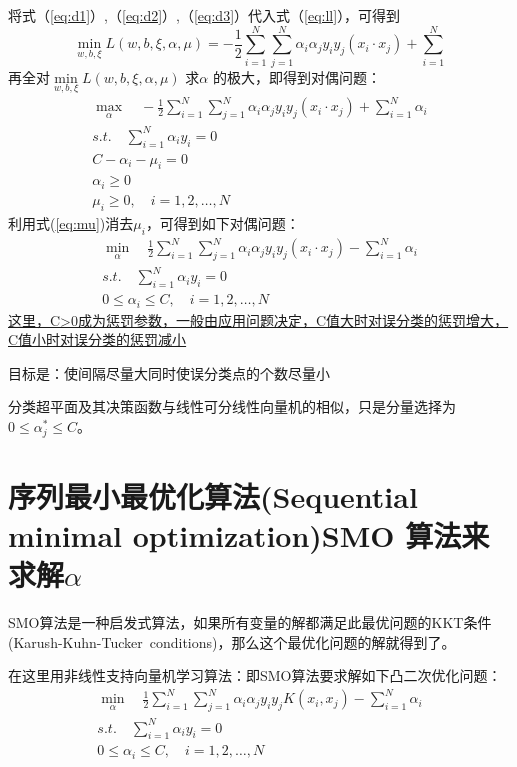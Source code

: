 \documentclass{article}
\begin{document}
将式（\ref{eq:d1}）,（\ref{eq:d2}）,（\ref{eq:d3}）代入式（\ref{eq:ll}），可得到
\begin{equation}
    \min\limits_{w,b,\xi} L(w,b,\xi,\alpha,\mu)=-\frac{1}{2}\sum_{i=1}^{N}\sum_{j=1}^{N}\alpha_i \alpha_j y_i y_j(x_i\cdot x_j)+\sum_{i=1}^{N}
\end{equation}
再全对$\min\limits_{w,b,\xi} L(w,b,\xi,\alpha,\mu)$ 求$\alpha$ 的极大，即得到对偶问题：
\begin{gather}
    \max\limits_{\alpha}\quad -\frac{1}{2}\sum_{i=1}^{N}\sum_{j=1}^{N}\alpha_i \alpha_j y_i y_j(x_i\cdot x_j)+\sum_{i=1}^{N}\alpha_i\\
    s.t.\quad \sum_{i=1}^{N}\alpha_i y_i=0\\
    C-\alpha_i-\mu_i=0   \label{eq:mu}\\
    \alpha_i\ge0\\
    \mu_i\ge0,\quad i=1,2,\dots,N
\end{gather}
利用式(\ref{eq:mu})消去$\mu_i$，可得到如下对偶问题：
\begin{gather}    
    \min\limits_{\alpha}\quad \frac{1}{2}\sum_{i=1}^{N}\sum_{j=1}^{N}\alpha_i \alpha_j y_i y_j(x_i\cdot x_j)-\sum_{i=1}^{N}\alpha_i\\
    s.t.\quad \sum_{i=1}^{N}\alpha_i y_i=0\\
    0\le \alpha_i \le C,\quad i=1,2,\dots,N
\end{gather}
\uline{这里，C>0成为惩罚参数，一般由应用问题决定，C值大时对误分类的惩罚增大，C值小时对误分类的惩罚减小} 

目标是：{\color{red}使间隔尽量大同时使误分类点的个数尽量小}

分类超平面及其决策函数与线性可分线性向量机的相似，只是分量选择为$0\le \alpha_j^* \le C$。
\section{序列最小最优化算法(Sequential minimal optimization)SMO 算法来求解$\alpha$}
SMO算法是一种启发式算法，如果所有变量的解都满足此最优问题的KKT条件(Karush-Kuhn-Tucker\ conditions)，那么这个最优化问题的解就得到了。

在这里用非线性支持向量机学习算法：即SMO算法要求解如下凸二次优化问题：
\begin{gather}    \label{eq:tuquestion}
    \min\limits_{\alpha}\quad \frac{1}{2}\sum_{i=1}^{N}\sum_{j=1}^{N}\alpha_i \alpha_j y_i y_j K(x_i,x_j)-\sum_{i=1}^{N}\alpha_i\\
    s.t.\quad \sum_{i=1}^{N}\alpha_i y_i=0\\
    0\le \alpha_i \le C,\quad i=1,2,\dots,N
\end{gather}
\end{document}
